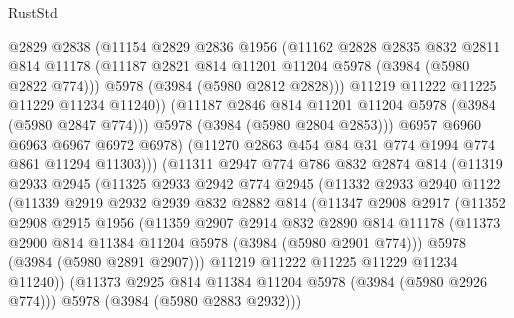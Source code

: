 \begin{lexlean}{RustStd}
\begin{coremodule}
                    @2829
                    @2838
                    (@11154
                      @2829
                      @2836
                      @1956
                      (@11162
                        @2828
                        @2835
                        @832
                        @2811
                        @814
                        @11178
                        (@11187 @2821 @814 @11201 @11204 @5978 (@3984 (@5980 @2822 @774)))
                        @5978
                        (@3984 (@5980 @2812 @2828)))
                      @11219
                      @11222
                      @11225
                      @11229
                      @11234
                      @11240))
                  (@11187 @2846 @814 @11201 @11204 @5978 (@3984 (@5980 @2847 @774)))
                  @5978
                  (@3984 (@5980 @2804 @2853)))
                @6957
                @6960
                @6963
                @6967
                @6972
                @6978)
              (@11270 @2863 @454 @84 @31 @774 @1994 @774 @861 @11294 @11303)))
          (@11311
            @2947
            @774
            @786
            @832
            @2874
            @814
            (@11319
              @2933
              @2945
              (@11325
                @2933
                @2942
                @774
                @2945
                (@11332
                  @2933
                  @2940
                  @1122
                  (@11339
                    @2919
                    @2932
                    @2939
                    @832
                    @2882
                    @814
                    (@11347
                      @2908
                      @2917
                      (@11352
                        @2908
                        @2915
                        @1956
                        (@11359
                          @2907
                          @2914
                          @832
                          @2890
                          @814
                          @11178
                          (@11373 @2900 @814 @11384 @11204 @5978 (@3984 (@5980 @2901 @774)))
                          @5978
                          (@3984 (@5980 @2891 @2907)))
                        @11219
                        @11222
                        @11225
                        @11229
                        @11234
                        @11240))
                    (@11373 @2925 @814 @11384 @11204 @5978 (@3984 (@5980 @2926 @774)))
                    @5978
                    (@3984 (@5980 @2883 @2932)))

\end{coremodule}
\end{lexlean}
